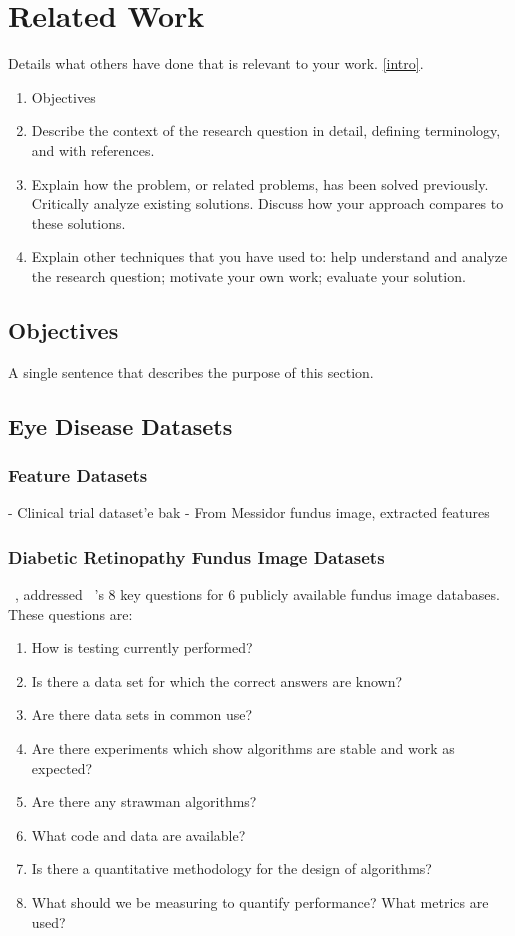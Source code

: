 \chapter{Related Work}

Details what others have done that is relevant to your work. \ref{intro}.
\begin{enumerate}
    \item Objectives
    \item Describe the context of the research question in detail, defining terminology, and with references.
    \item Explain how the problem, or related problems, has been solved previously. Critically analyze existing solutions. Discuss how your approach compares to these solutions.
    \item Explain other techniques that you have used to: help understand and analyze the research question; motivate your own work; evaluate your solution.
\end{enumerate}
\section{Objectives}
A single sentence that describes the purpose of this section.
\section{Eye Disease Datasets}
\subsection{Feature Datasets}
- Clinical trial dataset'e bak
- From Messidor fundus image, extracted features 
\subsection{Diabetic Retinopathy Fundus Image Datasets}

~\cite{kauppi2013constructing}, addressed ~\cite{thacker2008performance}'s 8 key questions for 6 publicly available fundus image databases. These questions are:

\begin{enumerate}
    \item How is testing currently performed?
    \item Is there a data set for which the correct answers are known?
    \item Are there data sets in common use?
    \item Are there experiments which show algorithms are stable and work as expected?
    \item Are there any strawman algorithms?
    \item What code and data are available?
    \item Is there a quantitative methodology for the design of algorithms?
    \item What should we be measuring to quantify performance? What metrics are used?
\end{enumerate}

